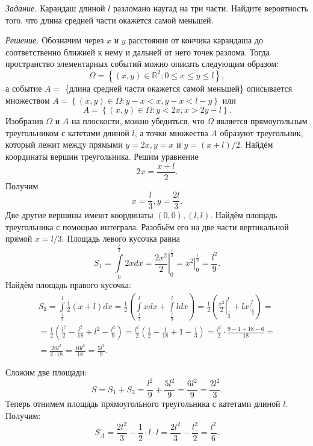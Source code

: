 \documentclass{book}
\begin{document}
\textit{Задание.} Карандаш длиной $l$ разломано наугад на три части.
Найдите вероятность того, что длина средней части окажется самой меньшей.

\textit{Решение.} Обозначим через $x$ и $y$ расстояния от кончика карандаша до соответственно ближней к нему и дальней от него точек разлома.
Тогда пространство элементарных событий можно описать следующим образом:
$$ \Omega =
\left\{ \left( x, y \right) \in \mathbb{R}^2:
0 \leq x \leq y \leq l \right\},$$
а событие $A =$
\{длина средней части окажется самой меньшей\} описывается множеством $A = \left\{ \left( x, y \right) \in \Omega: y - x < x, y - x < l - y \right\} $ или
$$A =
\left\{ \left( x, y \right) \in \Omega:
y < 2x,
x > 2y - l \right\}.$$ 
Изобразив $ \Omega $ и $A$ на плоскости,
можно убедиться,
что $ \Omega $ является прямоугольным треугольником с катетами длиной $l$,
а точки множества $A$ образуют треугольник, который лежит между прямыми $y = 2x, y = x$ и $y = \left( x+l \right) /2$.
Найдём координаты вершин треугольника.
Решим уравнение
$$2x = \frac{x+l}{2}.$$
Получим
$$x = \frac{l}{3}, y = \frac{2l}{3}.$$
Две другие вершины имеют координаты $ \left( 0, 0 \right), \left( l, l \right)$.
Найдём площадь треугольника с помощью интеграла.
Разобьём его на две части вертикальной прямой $x = l/3$.
Площадь левого кусочка равна 
$$S_1 =
\int \limits_{0}^{ \frac{l}{3} } 2 x dx =
\left. \frac{2x^2}{2} \right|_0^{ \frac{l}{3} } =
\left. x^2 \right|_0^{ \frac{l}{3} } =
\frac{l^2}{9}.$$
Найдём площадь правого кусочка:
\begin{equation*}
\begin{split}
S_2 =
\int \limits_{ \frac{l}{3} }^l \frac{1}{2} \left( x+l \right) dx =
\frac{1}{2} \left( \int \limits_{ \frac{l}{3} }^l x dx + \int \limits_{ \frac{l}{3} }^l l dx \right) =
\frac{1}{2} \left( \left. \frac{x^2}{2} \right|_{ \frac{l}{3} }^l + \left. lx \right|_{ \frac{l}{3} }^l \right) = \\
= \frac{1}{2} \left( \frac{l^2}{2} - \frac{l^2}{18} + l^2 - \frac{l^2}{9} \right) =
\frac{l^2}{2} \left( \frac{1}{2} - \frac{1}{18} + 1 - \frac{1}{3} \right) =
\frac{l^2}{2} \cdot \frac{9-1+18-6}{18} = \\
= \frac{20 l^2}{2 \cdot 18} =
\frac{10 l^2}{18} =
\frac{5 l^2}{9}.
\end{split}
\end{equation*}

Сложим две площади:
$$S =
S_1 + S_2 = 
\frac{l^2}{9} + \frac{5 l^2}{9} =
\frac{6 l^2}{9} =
\frac{2 l^2}{3}.$$
Теперь отнимем площадь прямоугольного треугольника с катетами длиной $l$.
Получим:
$$S_A =
\frac{2 l^2}{3} - \frac{1}{2} \cdot l \cdot l =
\frac{2 l^2}{3} - \frac{l^2}{2} =
\frac{l^2}{6}.$$
\end{document}
